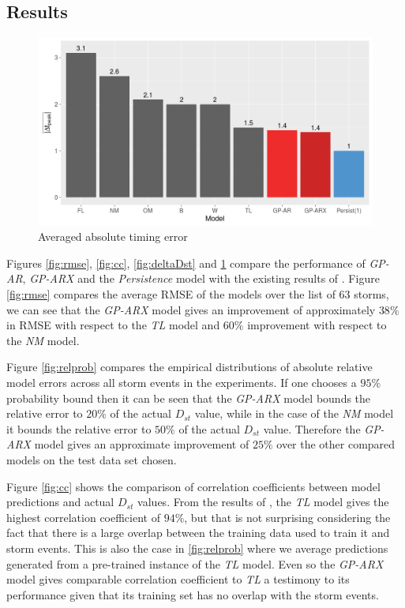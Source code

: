 \documentclass[referee,a4paper,12pt,traditabstract]{swsc}
\begin{document}
\begin{linenumbers}
\section{Results} \label{sec:res}
\begin{figure}
   \centering
   \includegraphics[width=\textwidth]{Compare_timingerr.png}
      \caption{Averaged absolute timing error}
         \label{fig:timingErr}
   \end{figure}



Figures \ref{fig:rmse}, \ref{fig:cc}, \ref{fig:deltaDst} and \ref{fig:timingErr} compare the performance of \emph{GP-AR}, \emph{GP-ARX} and the \emph{Persistence} model with the existing results of \citet{Ji2012}. Figure \ref{fig:rmse} compares the average RMSE of the models over the list of 63 storms, we can see that the \emph{GP-ARX} model gives an improvement of approximately $38\%$ in RMSE with respect to the \emph{TL} model and $60\%$ improvement with respect to the \emph{NM} model. 

Figure \ref{fig:relprob} compares the empirical distributions of absolute relative model errors across all storm events in the experiments. If one chooses a $95\%$ probability bound then it can be seen that the \emph{GP-ARX} model bounds the relative error to $20\%$ of the actual $D_{st}$ value, while in the case of the \emph{NM} model it bounds the relative error to $50\%$ of the actual $D_{st}$ value. Therefore the \emph{GP-ARX} model gives an approximate improvement of $25\%$ over the other compared models on the test data set chosen.

Figure \ref{fig:cc} shows the comparison of correlation coefficients between model predictions and actual $D_{st}$ values. From the results of \citet{Ji2012}, the \emph{TL} model gives the highest correlation coefficient of $94\%$, but that is not surprising considering the fact that there is a large overlap between the training data used to train it and storm events. This is also the case in \ref{fig:relprob} where we average predictions generated from a pre-trained instance of the \emph{TL} model. Even so the \emph{GP-ARX} model gives comparable correlation coefficient to \emph{TL} a testimony to its performance given that its training set has no overlap with the storm events.


\end{linenumbers}
\end{document}
